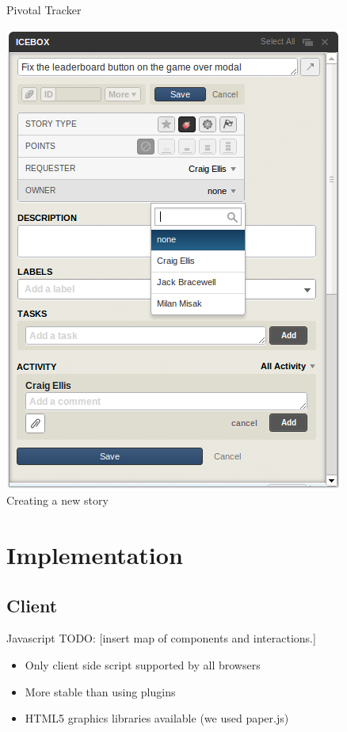 \documentclass{beamer}
\begin{document}
\begin{frame}{Pivotal Tracker}
  \begin{center}
    \includegraphics[scale=0.32]{pivotal_new_story.png} \\
    Creating a new story
  \end{center}
\end{frame}


\section{Implementation}
\subsection{Client}

\begin{frame}{Javascript}
  TODO:
  [insert map of components and interactions.]
  \begin{itemize}
    \item Only client side script supported by all browsers
    \vspace{\baselineskip}
    \item More stable than using plugins
    \vspace{\baselineskip}
    \item HTML5 graphics libraries available (we used paper.js)
  \end{itemize}
\end{frame}
\end{document}
